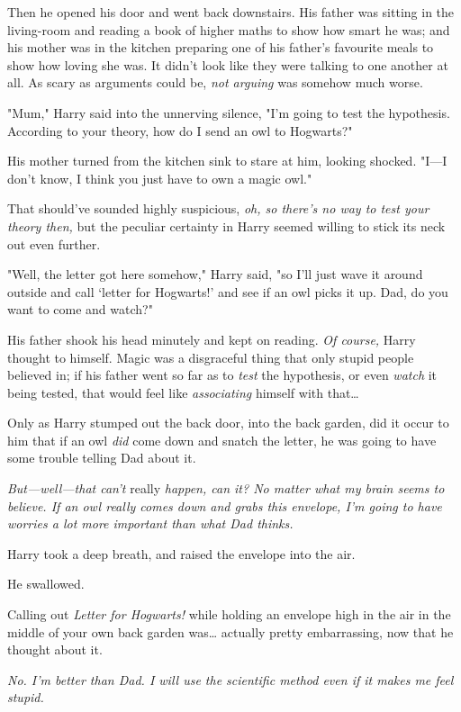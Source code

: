 Then he opened his door and went back downstairs. His father was sitting in the 
living-room and reading a book of higher maths to show how smart he was; and 
his mother was in the kitchen preparing one of his father's favourite meals to 
show how loving she was. It didn't look like they were talking to one another 
at all. As scary as arguments could be, \emph{not arguing} was somehow much 
worse.

"Mum," Harry said into the unnerving silence, "I'm going to test the 
hypothesis. According to your theory, how do I send an owl to Hogwarts?"

His mother turned from the kitchen sink to stare at him, looking shocked. 
"I---I don't know, I think you just have to own a magic owl."

That should've sounded highly suspicious, \emph{oh, so there's no way to test 
your theory then,} but the peculiar certainty in Harry seemed willing to stick 
its neck out even further.

"Well, the letter got here somehow," Harry said, "so I'll just wave it around 
outside and call `letter for Hogwarts!' and see if an owl picks it up. Dad, do 
you want to come and watch?"

His father shook his head minutely and kept on reading. \emph{Of course,} Harry 
thought to himself. Magic was a disgraceful thing that only stupid people 
believed in; if his father went so far as to \emph{test} the hypothesis, or 
even \emph{watch} it being tested, that would feel like \emph{associating} 
himself with that{\ldots}

Only as Harry stumped out the back door, into the back garden, did it occur to 
him that if an owl \emph{did} come down and snatch the letter, he was going to 
have some trouble telling Dad about it.

\emph{But---well---that can't} really \emph{happen, can it? No matter what my 
brain seems to believe. If an owl really comes down and grabs this envelope, 
I'm going to have worries a lot more important than what Dad thinks.}

Harry took a deep breath, and raised the envelope into the air.

He swallowed.

Calling out \emph{Letter for Hogwarts!} while holding an envelope high in the 
air in the middle of your own back garden was{\ldots} actually pretty 
embarrassing, now that he thought about it.

\emph{No. I'm better than Dad. I will use the scientific method even if it 
makes me feel stupid.}

